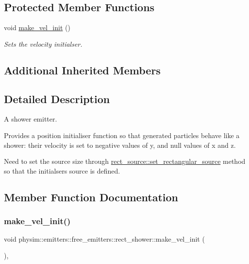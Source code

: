 \subsection*{Protected Member Functions}
\begin{DoxyCompactItemize}
\item 
void \hyperlink{classphysim_1_1emitters_1_1free__emitters_1_1rect__shower_ab1c7c992c636e3a15e70d6ce3180ed70}{make\+\_\+vel\+\_\+init} ()
\begin{DoxyCompactList}\small\item\em Sets the velocity initialser. \end{DoxyCompactList}\end{DoxyCompactItemize}
\subsection*{Additional Inherited Members}


\subsection{Detailed Description}
A shower emitter. 

Provides a position initialiser function so that generated particles behave like a shower\+: their velocity is set to negative values of y, and null values of x and z.

Need to set the source size through \hyperlink{classphysim_1_1emitters_1_1free__emitters_1_1rect__source_ab85134622163dfc1e3a77730ea94557e}{rect\+\_\+source\+::set\+\_\+rectangular\+\_\+source} method so that the initialser\textquotesingle{}s source is defined. 

\subsection{Member Function Documentation}
\mbox{\label{classphysim_1_1emitters_1_1free__emitters_1_1rect__shower_ab1c7c992c636e3a15e70d6ce3180ed70}} 
\subsubsection{\texorpdfstring{make\+\_\+vel\+\_\+init()}{make\_vel\_init()}}
{\footnotesize\ttfamily void physim\+::emitters\+::free\+\_\+emitters\+::rect\+\_\+shower\+::make\+\_\+vel\+\_\+init (\begin{DoxyParamCaption}{ }\end{DoxyParamCaption})\hspace{0.3cm}{\ttfamily [protected]}, {\ttfamily [virtual]}}



